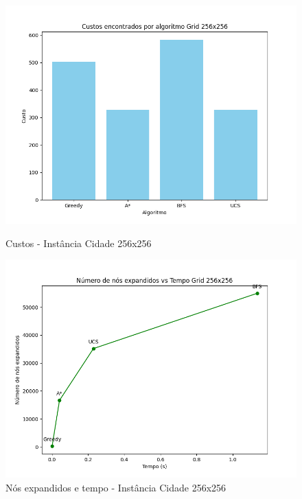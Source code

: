 \documentclass[10pt]{extarticle} %
\begin{document}
\begin{figure}[H]
    \centering
    \begin{minipage}{0.5\linewidth}
        \centering
        \includegraphics[width=\linewidth]{cost_per_algorithm_256x256.png}
        \caption{Custos - Instância Cidade 256x256}
        \label{fig:cost-per-algorithm}
    \end{minipage}%
    \begin{minipage}{0.5\linewidth}
        \centering
        \includegraphics[width=\linewidth]{expanded_nodes_vs_time_labeled_256x256.png}
        \caption{Nós expandidos e tempo - Instância Cidade 256x256}
        \label{fig:expanded-nodes-vs-time}
    \end{minipage}
\end{figure}
\end{document}
